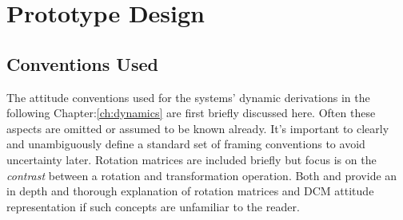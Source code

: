 \chapter{Prototype Design}
\label{ch:proto}
\section{Conventions Used}
\label{sec:proto.conventions}
The attitude conventions used for the systems' dynamic derivations in the following Chapter:\ref{ch:dynamics} are first briefly discussed here. Often these aspects are omitted or assumed to be known already. It's important to clearly and unambiguously define a standard set of framing conventions to avoid uncertainty later. Rotation matrices are included briefly but focus is on the \emph{contrast} between a rotation and transformation operation. Both \cite{spacecraftattitutdequaternions} and \cite{rigidbodylecture} provide an in depth and thorough explanation of rotation matrices and DCM attitude representation if such concepts are unfamiliar to the reader.
